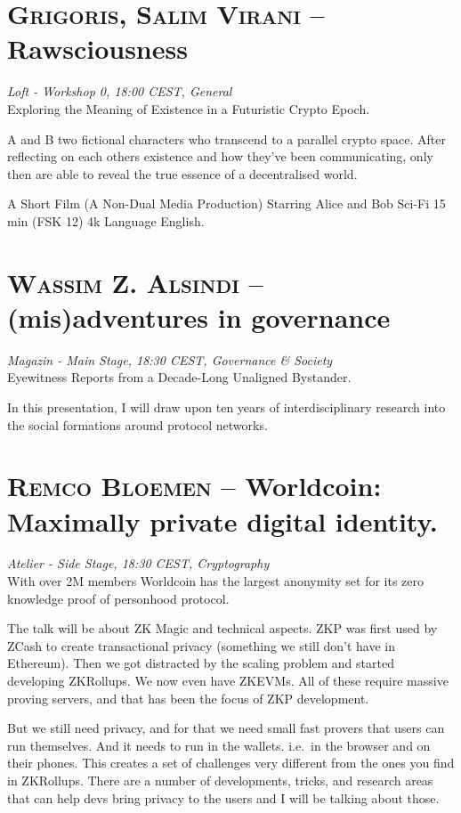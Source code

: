 \section {\textsc{Grigoris, Salim Virani} -- Rawsciousness
} \noindent \textit {Loft - Workshop 0, 18:00 CEST, General
}\\[1em] Exploring the Meaning of Existence in a Futuristic Crypto Epoch.
\par A and B two fictional characters who transcend to a parallel crypto space.
After reflecting on each others existence and how they've been communicating,
only then are able to reveal the true essence of a decentralised world.

A Short Film (A Non-Dual Media Production)
Starring Alice and Bob
Sci-Fi 15 min (FSK 12) 4k
Language English.
\clearpage
\section {\textsc{Wassim Z. Alsindi} -- (mis)adventures in governance
} \noindent \textit {Magazin - Main Stage, 18:30 CEST, Governance \&
 Society
}\\[1em] Eyewitness Reports from a Decade-Long Unaligned Bystander.
\par In this presentation, I will draw upon ten years of interdisciplinary research into the social formations around protocol networks.
\clearpage
\section {\textsc{Remco Bloemen} -- Worldcoin: Maximally private digital identity.
} \noindent \textit {Atelier - Side Stage, 18:30 CEST, Cryptography
}\\[1em] With over 2M members Worldcoin has the largest anonymity set for its zero knowledge proof of personhood protocol.
\par The talk will be about ZK Magic and technical aspects. ZKP was first used by ZCash to create transactional privacy (something we still don't have in Ethereum). Then we got distracted by the scaling problem and started developing ZKRollups. We now even have ZKEVMs. All of these require massive proving servers, and that has been the focus of ZKP development.

But we still need privacy, and for that we need small fast provers that users can run themselves. And it needs to run in the wallets. i.e.~in the browser and on their phones. This creates a set of challenges very different from the ones you find in ZKRollups. There are a number of developments, tricks, and research areas that can help devs bring privacy to the users and I will be talking about those.
\clearpage
